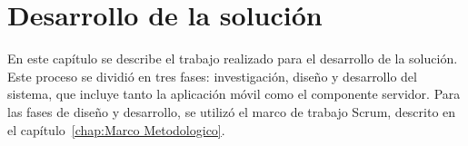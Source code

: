\chapter{Desarrollo de la solución} \label{chapter:Desarrollo de la aplicacion}

En este capítulo se describe el trabajo realizado para el desarrollo de la solución. Este proceso se dividió en tres fases: investigación, diseño y desarrollo del sistema, que incluye tanto la aplicación móvil como el componente servidor. Para las fases de diseño y desarrollo, se utilizó el marco de trabajo Scrum, descrito en el capítulo~\ref{chap:Marco Metodologico}.
